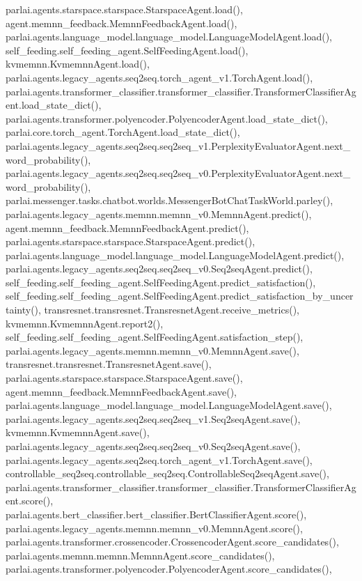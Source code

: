 parlai.\+agents.\+starspace.\+starspace.\+Starspace\+Agent.\+load(), agent.\+memnn\+\_\+feedback.\+Memnn\+Feedback\+Agent.\+load(), parlai.\+agents.\+language\+\_\+model.\+language\+\_\+model.\+Language\+Model\+Agent.\+load(), self\+\_\+feeding.\+self\+\_\+feeding\+\_\+agent.\+Self\+Feeding\+Agent.\+load(), kvmemnn.\+Kvmemnn\+Agent.\+load(), parlai.\+agents.\+legacy\+\_\+agents.\+seq2seq.\+torch\+\_\+agent\+\_\+v1.\+Torch\+Agent.\+load(), parlai.\+agents.\+transformer\+\_\+classifier.\+transformer\+\_\+classifier.\+Transformer\+Classifier\+Agent.\+load\+\_\+state\+\_\+dict(), parlai.\+agents.\+transformer.\+polyencoder.\+Polyencoder\+Agent.\+load\+\_\+state\+\_\+dict(), parlai.\+core.\+torch\+\_\+agent.\+Torch\+Agent.\+load\+\_\+state\+\_\+dict(), parlai.\+agents.\+legacy\+\_\+agents.\+seq2seq.\+seq2seq\+\_\+v1.\+Perplexity\+Evaluator\+Agent.\+next\+\_\+word\+\_\+probability(), parlai.\+agents.\+legacy\+\_\+agents.\+seq2seq.\+seq2seq\+\_\+v0.\+Perplexity\+Evaluator\+Agent.\+next\+\_\+word\+\_\+probability(), parlai.\+messenger.\+tasks.\+chatbot.\+worlds.\+Messenger\+Bot\+Chat\+Task\+World.\+parley(), parlai.\+agents.\+legacy\+\_\+agents.\+memnn.\+memnn\+\_\+v0.\+Memnn\+Agent.\+predict(), agent.\+memnn\+\_\+feedback.\+Memnn\+Feedback\+Agent.\+predict(), parlai.\+agents.\+starspace.\+starspace.\+Starspace\+Agent.\+predict(), parlai.\+agents.\+language\+\_\+model.\+language\+\_\+model.\+Language\+Model\+Agent.\+predict(), parlai.\+agents.\+legacy\+\_\+agents.\+seq2seq.\+seq2seq\+\_\+v0.\+Seq2seq\+Agent.\+predict(), self\+\_\+feeding.\+self\+\_\+feeding\+\_\+agent.\+Self\+Feeding\+Agent.\+predict\+\_\+satisfaction(), self\+\_\+feeding.\+self\+\_\+feeding\+\_\+agent.\+Self\+Feeding\+Agent.\+predict\+\_\+satisfaction\+\_\+by\+\_\+uncertainty(), transresnet.\+transresnet.\+Transresnet\+Agent.\+receive\+\_\+metrics(), kvmemnn.\+Kvmemnn\+Agent.\+report2(), self\+\_\+feeding.\+self\+\_\+feeding\+\_\+agent.\+Self\+Feeding\+Agent.\+satisfaction\+\_\+step(), parlai.\+agents.\+legacy\+\_\+agents.\+memnn.\+memnn\+\_\+v0.\+Memnn\+Agent.\+save(), transresnet.\+transresnet.\+Transresnet\+Agent.\+save(), parlai.\+agents.\+starspace.\+starspace.\+Starspace\+Agent.\+save(), agent.\+memnn\+\_\+feedback.\+Memnn\+Feedback\+Agent.\+save(), parlai.\+agents.\+language\+\_\+model.\+language\+\_\+model.\+Language\+Model\+Agent.\+save(), parlai.\+agents.\+legacy\+\_\+agents.\+seq2seq.\+seq2seq\+\_\+v1.\+Seq2seq\+Agent.\+save(), kvmemnn.\+Kvmemnn\+Agent.\+save(), parlai.\+agents.\+legacy\+\_\+agents.\+seq2seq.\+seq2seq\+\_\+v0.\+Seq2seq\+Agent.\+save(), parlai.\+agents.\+legacy\+\_\+agents.\+seq2seq.\+torch\+\_\+agent\+\_\+v1.\+Torch\+Agent.\+save(), controllable\+\_\+seq2seq.\+controllable\+\_\+seq2seq.\+Controllable\+Seq2seq\+Agent.\+save(), parlai.\+agents.\+transformer\+\_\+classifier.\+transformer\+\_\+classifier.\+Transformer\+Classifier\+Agent.\+score(), parlai.\+agents.\+bert\+\_\+classifier.\+bert\+\_\+classifier.\+Bert\+Classifier\+Agent.\+score(), parlai.\+agents.\+legacy\+\_\+agents.\+memnn.\+memnn\+\_\+v0.\+Memnn\+Agent.\+score(), parlai.\+agents.\+transformer.\+crossencoder.\+Crossencoder\+Agent.\+score\+\_\+candidates(), parlai.\+agents.\+memnn.\+memnn.\+Memnn\+Agent.\+score\+\_\+candidates(), parlai.\+agents.\+transformer.\+polyencoder.\+Polyencoder\+Agent.\+score\+\_\+candidates(), 